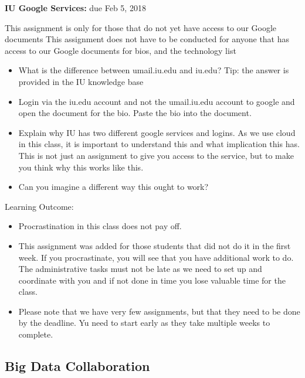 \begin{exercise}\label{E:616-iu-google}

  {\bf IU Google Services:} due Feb 5, 2018
  
  This assignment is only for those that do
  not yet have access to our Google documents This assignment does not
  have to be conducted for anyone that has access to our Google
  documents for bios, and the technology list

  \begin{itemize}
 
  \item What is the difference between umail.iu.edu and iu.edu? Tip:
    the answer is provided in the IU knowledge base

  \item Login via the iu.edu account and not the umail.iu.edu account
    to google and open the document for the bio. Paste the bio into
    the document.

  \item Explain why IU has two different google services and
    logins. As we use cloud in this class, it is important to
    understand this and what implication this has. This is not just an
    assignment to give you access to the service, but to make you
    think why this works like this.

  \item Can you imagine a different way this ought to work?

  \end{itemize}

\end{exercise}

Learning Outcome:

\begin{itemize}
\item Procrastination in this class does not pay off. 
\item This assignment
  was added for those students that did not do it in the first week. If you
  procrastinate, you will see that you have additional work to do. The
  administrative tasks must not be late as we need to set up and
  coordinate with you and if not done in time you lose valuable time
  for the class. 
\item Please note that we have very few assignments, but that they
  need to be done by the deadline. Yu need to start early as they take
  multiple weeks to complete.
\end{itemize}

\subsection{Big Data Collaboration}
\label{E:616-bigdata-collab}

